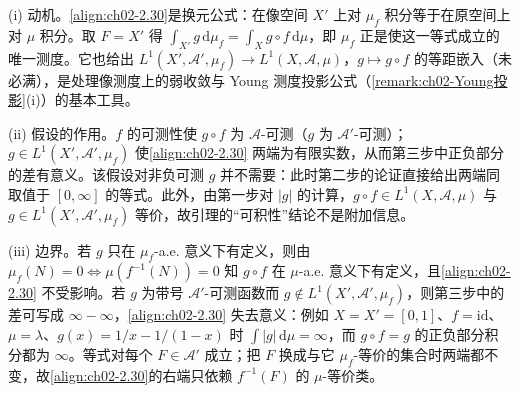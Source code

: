 \documentclass[../../main.tex]{subfiles}%
\begin{document}
\begin{remark}\label{remark:ch02-像测度积分动机}
(i) 动机。\eqref{align:ch02-2.30}是换元公式：在像空间 $X'$ 上对 $\mu_f$ 积分等于在原空间上对 $\mu$ 积分。取 $F=X'$ 得 $\int_{X'}g\,\mathrm{d}\mu_f=\int_Xg\circ f\,\mathrm{d}\mu$，即 $\mu_f$ 正是使这一等式成立的唯一测度。它也给出 $L^1(X',\mathscr A',\mu_f)\to L^1(X,\mathscr A,\mu)$，$g\mapsto g\circ f$ 的等距嵌入（未必满），是处理像测度上的弱收敛与 Young 测度投影公式（\cref{remark:ch02-Young投影}(i)）的基本工具。

(ii) 假设的作用。$f$ 的可测性使 $g\circ f$ 为 $\mathscr A$-可测（$g$ 为 $\mathscr A'$-可测）；$g\in L^1(X',\mathscr A',\mu_f)$ 使\eqref{align:ch02-2.30} 两端为有限实数，从而第三步中正负部分的差有意义。该假设对非负可测 $g$ 并不需要：此时第二步的论证直接给出两端同取值于 $[0,\infty]$ 的等式。此外，由第一步对 $|g|$ 的计算，$g\circ f\in L^1(X,\mathscr A,\mu)$ 与 $g\in L^1(X',\mathscr A',\mu_f)$ 等价，故引理的“可积性”结论不是附加信息。

(iii) 边界。若 $g$ 只在 $\mu_f$-a.e. 意义下有定义，则由 $\mu_f(N)=0\Leftrightarrow\mu(f^{-1}(N))=0$ 知 $g\circ f$ 在 $\mu$-a.e. 意义下有定义，且\eqref{align:ch02-2.30} 不受影响。若 $g$ 为带号 $\mathscr A'$-可测函数而 $g\notin L^1(X',\mathscr A',\mu_f)$，则第三步中的差可写成 $\infty-\infty$，\eqref{align:ch02-2.30} 失去意义：例如 $X=X'=[0,1]$、$f=\mathrm{id}$、$\mu=\lambda$、$g(x)=1/x-1/(1-x)$ 时 $\int|g|\,\mathrm{d}\mu=\infty$，而 $g\circ f=g$ 的正负部分积分都为 $\infty$。等式对每个 $F\in\mathscr A'$ 成立；把 $F$ 换成与它 $\mu_f$-等价的集合时两端都不变，故\eqref{align:ch02-2.30}的右端只依赖 $f^{-1}(F)$ 的 $\mu$-等价类。
\end{remark}
\end{document}
